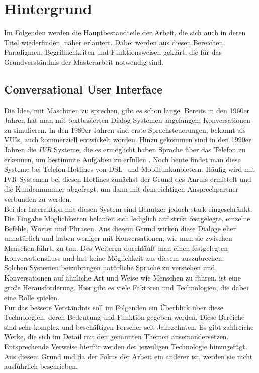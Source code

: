 \chapter{Hintergrund}
\label{cha:hintergrund}
Im Folgenden werden die Hauptbestandteile der Arbeit, die sich auch in deren Titel wiederfinden, näher erläutert. Dabei werden aus diesen Bereichen Paradigmen, Begrifflichkeiten und Funktionsweisen geklärt, die für das Grundverständnis der Masterarbeit notwendig sind. 

\section{Conversational User Interface}
\label{sec:conversational-user-interface}
Die Idee, mit Maschinen zu sprechen, gibt es schon lange. Bereits in den 1960er Jahren hat man mit textbasierten Dialog-Systemen angefangen, Konversationen zu simulieren. In den 1980er Jahren sind erste Sprachsteuerungen, bekannt als \acp{VUI}, auch kommerziell entwickelt worden. Hinzu gekommen sind in den 1990er Jahren die \textit{\ac{IVR}} Systeme, die es ermöglicht haben Sprache über das Telefon zu erkennen, um bestimmte Aufgaben zu erfüllen \cite{mctear-cui}. Noch heute findet man diese Systeme \zB bei Telefon Hotlines von DSL- und Mobilfunkanbietern. Häufig wird mit \ac{IVR} Systemen bei diesen Hotlines zunächst der Grund des Anrufs ermittelt und die Kundennummer abgefragt, um dann mit dem richtigen Ansprechpartner verbunden zu werden. \\
Bei der Interaktion mit diesen System sind Benutzer jedoch stark eingeschränkt. Die Eingabe Möglichkeiten belaufen sich lediglich auf strikt festgelegte, einzelne Befehle, Wörter und Phrasen. Aus diesem Grund wirken diese Dialoge eher unnatürlich und haben weniger mit Konversationen, wie man sie zwischen Menschen führt, zu tun. Des Weiteren durchläuft man einen festgelegten Konversationsfluss und hat keine Möglichkeit aus diesem auszubrechen.\\
Solchen Systemen beizubringen natürliche Sprache zu verstehen und Konversationen auf ähnliche Art und Weise wie Menschen zu führen, ist eine große Herausforderung. Hier gibt es viele Faktoren und Technologien, die dabei eine Rolle spielen.\\ 
Für das bessere Verständnis soll im Folgenden ein Überblick über diese Technologien, deren Bedeutung und Funktion gegeben werden. Diese Bereiche sind sehr komplex und beschäftigen Forscher seit Jahrzehnten. Es gibt zahlreiche Werke, die sich im Detail mit den genannten Themen auseinandersetzen. Entsprechende Verweise hierfür werden der jeweiligen Technologie hinzugefügt. Aus diesem Grund und da der Fokus der Arbeit ein anderer ist, werden sie nicht ausführlich beschrieben. 

